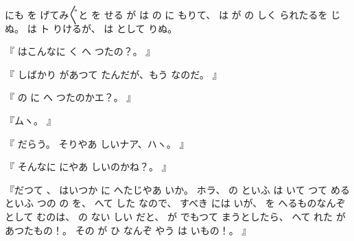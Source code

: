 にも
を
げてみ〴〵と
を
せる
が
は
の
に
もりて、
は
が
の
しく
られたるを
じぬ。
は
ト
りけるが、
は
として
りぬ。

『
はこんなに
く
へ
つたの？。
』

『
しばかり
があつて
たんだが、もう
なのだ。
』

『
の
に
へ
つたのかエ？。
』

『ムヽ。
』

『
だらう。
そりやあ
しいナア、ハヽ。
』

『
そんなに
にやあ
しいのかね？。
』

『だつて
、
はいつか
に
へたじやあ
いか。
ホラ、
の
といふ
は
いて
つて
めるといふ
つの
の
を、
へて
した
なので、
すべき
には
いが、
を
へるものなんぞとして
むのは、
の
ない
しい
だと、
が
でもつて
まうとしたら、
へて
れた
があつたもの！。
その
が
ひ
なんぞ
やう
は
いもの！。
』

